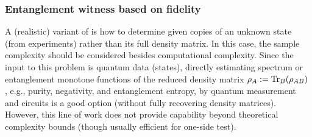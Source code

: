 \documentclass[
aps,
pra,
twocolumn,
floatfix,
]{revtex4-2}
\theoremstyle{plain}
\theoremstyle{definition}
\newcommand{\dm}{\rho}
\newcommand{\U}{U}
\begin{document}
\subsubsection{Entanglement witness based on fidelity}\label{sec:entanglement_witness}
A (realistic) variant of  is how to determine  given copies of an unknown state (from experiments) rather than its full density matrix.
In this case, the sample complexity should be considered besides computational complexity.
Since the input to this problem is quantum data (states), directly estimating spectrum or entanglement monotone functions of the reduced density matrix $\rho_A:=\Tr_B(\rho_{AB})$ \cite{ekertDirectEstimationsLinear2002} \cite{horodeckiDirectDetectionQuantum2002} \cite{johriEntanglementSpectroscopyQuantum2017}, e.g., purity, negativity, and entanglement entropy, by quantum measurement and circuits \cite{wang16qubitIBMUniversal2018} \cite{quekMultivariateTraceEstimation2022} is a good option (without fully recovering density matrices).
However, this line of work does not provide capability beyond theoretical complexity bounds (though usually efficient for one-side test).
\end{document}
